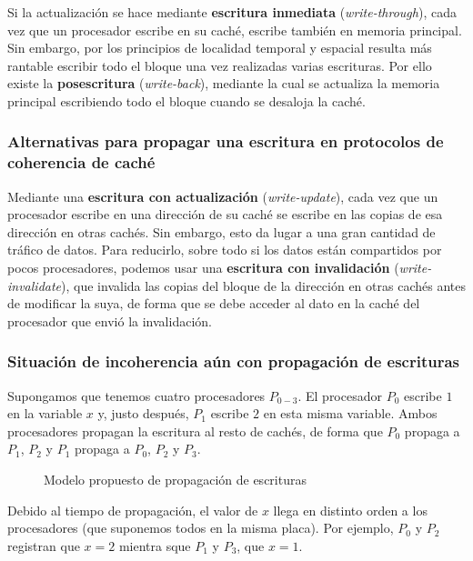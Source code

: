Si la actualización se hace mediante \textbf{escritura inmediata} (\textit{write-through}), cada vez que un procesador escribe en su caché, escribe también en memoria principal.
Sin embargo, por los principios de localidad temporal y espacial resulta más rantable escribir todo el bloque una vez realizadas varias escrituras.
Por ello existe la \textbf{posescritura} (\textit{write-back}), mediante la cual se actualiza la memoria principal escribiendo todo el bloque cuando se desaloja la caché.

\subsubsection{Alternativas para propagar una escritura en protocolos de coherencia de caché}

Mediante una \textbf{escritura con actualización} (\textit{write-update}), cada vez que un procesador escribe en una dirección de su caché se escribe en las copias de esa dirección en otras cachés.
Sin embargo, esto da lugar a una gran cantidad de tráfico de datos.
Para reducirlo, sobre todo si los datos están compartidos por pocos procesadores, podemos usar una \textbf{escritura con invalidación} (\textit{write-invalidate}), que invalida las copias del bloque de la dirección en otras cachés antes de modificar la suya, de forma que se debe acceder al dato en la caché del procesador que envió la invalidación.

\subsubsection{Situación de incoherencia aún con propagación de escrituras}

Supongamos que tenemos cuatro procesadores $P_{0-3}$.
El procesador $P_0$ escribe $1$ en la variable $x$ y, justo después, $P_1$ escribe $2$ en esta misma variable.
Ambos procesadores propagan la escritura al resto de cachés, de forma que $P_0$ propaga a $P_1$, $P_2$ y $P_1$ propaga a $P_0$, $P_2$ y $P_3$.

\begin{figure}[h]
\begin{center}

\end{center}
\caption{Modelo propuesto de propagación de escrituras}
\end{figure}

Debido al tiempo de propagación, el valor de $x$ llega en distinto orden a los procesadores (que suponemos todos en la misma placa).
Por ejemplo, $P_0$ y $P_2$ registran que $x=2$ mientra sque $P_1$ y $P_3$, que $x=1$.

